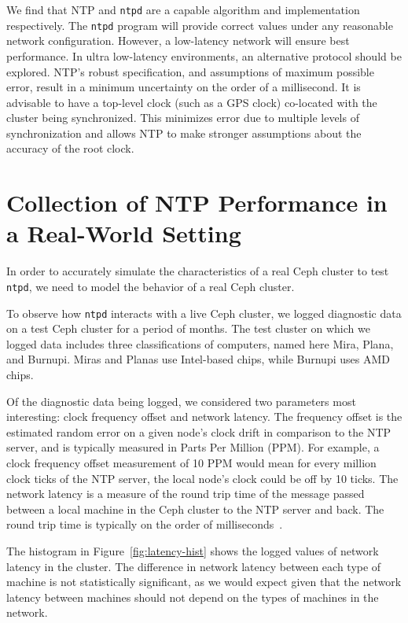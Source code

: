 We find that NTP and \texttt{ntpd} are a capable algorithm and implementation
respectively.
The \texttt{ntpd} program will provide correct values under any reasonable 
network configuration. However, a low-latency network will ensure best 
performance. In ultra low-latency environments, an alternative protocol 
should be explored. NTP's robust specification, and assumptions of maximum possible
error, result in a minimum uncertainty on the order of a millisecond. 
It is advisable to have a top-level clock (such as a GPS clock)
co-located with the cluster being synchronized. This minimizes error due to
multiple levels of synchronization and allows NTP to make stronger assumptions
about the accuracy of the root clock. 



\section{Collection of NTP Performance in a Real-World Setting}

In order to accurately simulate the
characteristics of a real Ceph cluster to test \texttt{ntpd}, we need to model the
behavior of a real Ceph cluster.

To observe how \texttt{ntpd} interacts with a live Ceph cluster,
we logged diagnostic data on a test Ceph cluster for a period of months.
The test cluster on which we logged data includes 
three classifications of computers, named here Mira,
Plana, and Burnupi. Miras and Planas use Intel-based chips, while
Burnupi uses AMD chips.

Of the diagnostic data being logged, 
we considered two parameters most interesting: clock frequency offset and
network latency. 
The frequency offset is the estimated random error on a given node's
clock drift in comparison to the NTP server, and is typically measured in Parts
Per Million (PPM). For example, a clock frequency offset measurement of 10 PPM would
mean for every million clock ticks of the NTP server, the local
node's clock could be off by 10 ticks. The network latency is a measure of
the round trip time of the message passed between a local machine in
the Ceph cluster to the NTP server and back. The round trip time
is typically on the order of milliseconds~\citep{Sage}.

The histogram in Figure~\ref{fig:latency-hist} shows the logged
values of network latency in the cluster. The 
difference in network latency between each type of machine is not
statistically significant, as we would expect given that the network
latency between machines should not depend on the types of 
machines in the network. 


